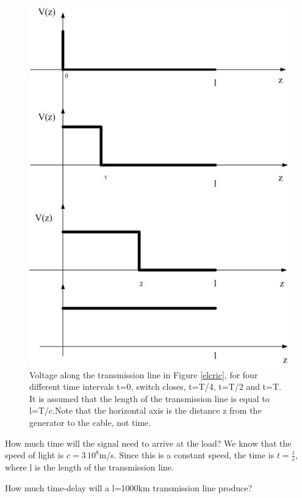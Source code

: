 \documentclass{ximera}
\begin{document}
\begin{figure}[htbp]
\begin{center}
\includegraphics[scale=0.5]{jpg/timedelayedsignaltl.jpg}
\end{center}
\caption{Voltage along the transmission line in Figure \ref{elcric}, for four different time intervals t=0, switch closes, t=T/4, t=T/2 and t=T. It is assumed that the length of the transmission line is equal to l=T/c.Note that the horizontal axis is the distance z from the generator to the cable, not time. }
\label{delayedsig}
\end{figure}

How much time will the signal need to arrive at the load? We know that the speed of light is $c=3\,10^8$m/s. Since this is a constant speed, the time is $t=\frac{l}{c}$, where l is the length of the transmission line.

\begin{question}  
How much time-delay will a l=1000km transmission line produce?  
\begin{multipleChoice}  
\end{multipleChoice}  
\end{question} 
\end{document}
